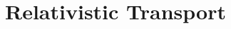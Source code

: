 \documentclass[doctor]{thesis}
\begin{document}
%
%

\section{Relativistic Transport}
\label{sec:relativistic_transport}





%
%
%
%

%




\end{document}
